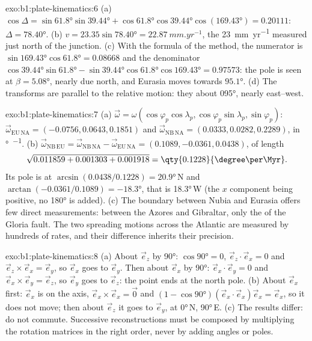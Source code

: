 \begin{solution}{exo:b1:plate-kinematics:6}
(a) $\cos\Delta = \sin\ang{61.8}\sin\ang{39.44} + \cos\ang{61.8}\cos\ang{39.44}
\cos(\ang{169.43}) = 0.20111$: $\Delta = \ang{78.40}$. (b) $v = 23.35
\sin\ang{78.40} = \qty{22.87}{mm.yr^{-1}}$, the \qty{23}{mm.yr^{-1}} measured
just north of the junction. (c) With the formula of the method, the numerator
is $\sin\ang{169.43}\cos\ang{61.8} = 0.08668$ and the denominator
$\cos\ang{39.44}\sin\ang{61.8} - \sin\ang{39.44}\cos\ang{61.8}\cos\ang{169.43}
= 0.97573$: the pole is seen at $\beta = \ang{5.08}$, nearly due north, and
Eurasia moves towards $\ang{95.1}$. (d) The transforms are parallel to the
relative motion: they  about \ang{095}, nearly east--west.
\end{solution}

\begin{solution}{exo:b1:plate-kinematics:7}
(a) $\vec\omega = \omega(\cos\varphi_p\cos\lambda_p, \cos\varphi_p\sin\lambda_p,
\sin\varphi_p)$: $\vec\omega_{\mathrm{EU\,NA}} = (-0.0756, 0.0643, 0.1851)$ and
$\vec\omega_{\mathrm{NB\,NA}} = (0.0333, 0.0282, 0.2289)$, in
\unit{\degree\per\Myr}. (b) $\vec\omega_{\mathrm{NB\,EU}} =
\vec\omega_{\mathrm{NB\,NA}} - \vec\omega_{\mathrm{EU\,NA}} = (0.1089, -0.0361,
0.0438)$, of length
\[
  \sqrt{0.011859 + 0.001303 + 0.001918} = \qty{0.1228}{\degree\per\Myr}.
\]
Its pole is at 
$\arcsin(0.0438/0.1228) = \ang{20.9}$\,N and 
$\arctan(-0.0361/0.1089) = \ang{-18.3}$, that is \ang{18.3}\,W (the
$x$ component being positive, no \ang{180} is added). (c) The boundary between
Nubia and Eurasia offers few direct measurements: between the Azores and
Gibraltar, only the  of the Gloria fault. The two spreading motions
across the Atlantic are measured by hundreds of rates, and their difference
inherits their precision.
\end{solution}

\begin{solution}{exo:b1:plate-kinematics:8}
(a) About $\vec e_z$ by \ang{90}: $\cos\ang{90} = 0$, $\vec e_z\cdot\vec e_x = 0$
and $\vec e_z\times\vec e_x = \vec e_y$, so $\vec e_x$ goes to $\vec e_y$. Then
about $\vec e_x$ by \ang{90}: $\vec e_x\cdot\vec e_y = 0$ and
$\vec e_x\times\vec e_y = \vec e_z$, so $\vec e_y$ goes to $\vec e_z$: the point
ends at the north pole. (b) About $\vec e_x$ first: $\vec e_x$ is on the axis,
$\vec e_x\times\vec e_x = \vec 0$ and $(1 - \cos\ang{90})(\vec e_x\cdot\vec e_x)
\vec e_x = \vec e_x$, so it does not move; then about $\vec e_z$ it goes to
$\vec e_y$, at \ang{0}\,N, \ang{90}\,E. (c) The results differ:  do not commute. Successive reconstructions must be composed by
multiplying the rotation matrices in the right order, never by adding angles
or poles.
\end{solution}

